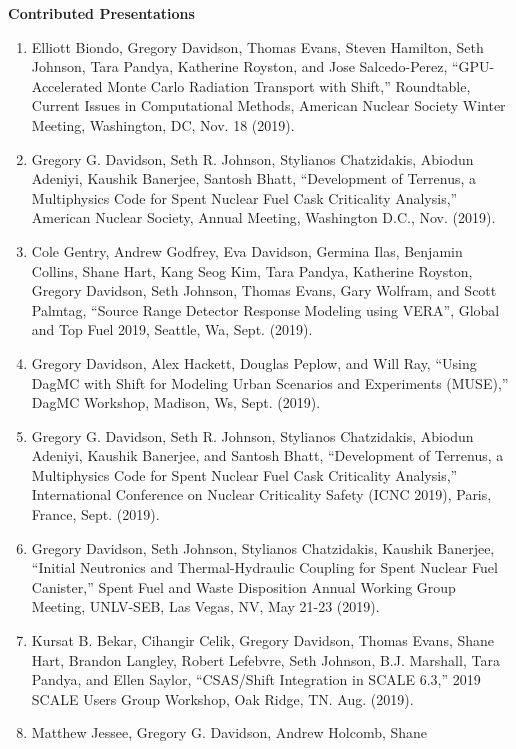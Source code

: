 \documentclass[letterpaper,11pt]{article}
\newcommand{\leftsubheading}[1]{
  \textbf{#1\vspace{-6pt} \\}}
\begin{document}

\leftsubheading{Contributed Presentations}
\begin{enumerate}
  \item Elliott Biondo, Gregory Davidson, Thomas Evans, Steven
    Hamilton, Seth Johnson, Tara Pandya, Katherine Royston, and Jose
    Salcedo-Perez, ``GPU-Accelerated Monte Carlo Radiation Transport
    with Shift,'' Roundtable, Current Issues in Computational Methods,
    American Nuclear Society Winter Meeting, Washington, DC, Nov. 18
    (2019).
  \item Gregory G. Davidson, Seth R. Johnson, Stylianos Chatzidakis,
    Abiodun Adeniyi, Kaushik Banerjee, Santosh Bhatt, ``Development
    of Terrenus, a Multiphysics Code for Spent Nuclear Fuel Cask
    Criticality Analysis,'' American Nuclear Society, Annual
    Meeting, Washington D.C., Nov. (2019).
  \item Cole Gentry, Andrew Godfrey, Eva Davidson, Germina Ilas,
    Benjamin Collins, Shane Hart, Kang Seog Kim, Tara Pandya,
    Katherine Royston, Gregory Davidson, Seth Johnson, Thomas Evans,
    Gary Wolfram, and Scott Palmtag, ``Source Range Detector
    Response Modeling using VERA'', Global and Top Fuel 2019,
    Seattle, Wa, Sept. (2019).
  \item Gregory Davidson, Alex Hackett, Douglas Peplow, and Will
    Ray, ``Using DagMC with Shift for Modeling Urban Scenarios and
    Experiments (MUSE),'' DagMC Workshop, Madison, Ws, Sept. (2019).
  \item Gregory G. Davidson, Seth R. Johnson, Stylianos Chatzidakis,
    Abiodun Adeniyi, Kaushik Banerjee, and Santosh Bhatt,
    ``Development of Terrenus, a Multiphysics Code for Spent Nuclear
    Fuel Cask Criticality Analysis,'' International Conference on
    Nuclear Criticality Safety (ICNC 2019), Paris, France,
    Sept. (2019).
  \item Gregory Davidson, Seth Johnson, Stylianos Chatzidakis, Kaushik
    Banerjee, ``Initial Neutronics and Thermal-Hydraulic Coupling for
    Spent Nuclear Fuel Canister,'' Spent Fuel and Waste Disposition
    Annual Working Group Meeting, UNLV-SEB, Las Vegas, NV, May 21-23
    (2019). 
  \item Kursat B. Bekar, Cihangir Celik, Gregory Davidson, Thomas
    Evans, Shane Hart, Brandon Langley, Robert Lefebvre, Seth
    Johnson, B.J. Marshall, Tara Pandya, and Ellen Saylor,
    ``CSAS/Shift Integration in SCALE 6.3,'' 2019 SCALE Users Group
    Workshop, Oak Ridge, TN. Aug. (2019).
  \item Matthew Jessee, Gregory G. Davidson, Andrew Holcomb, Shane

\end{enumerate}
\end{document}

